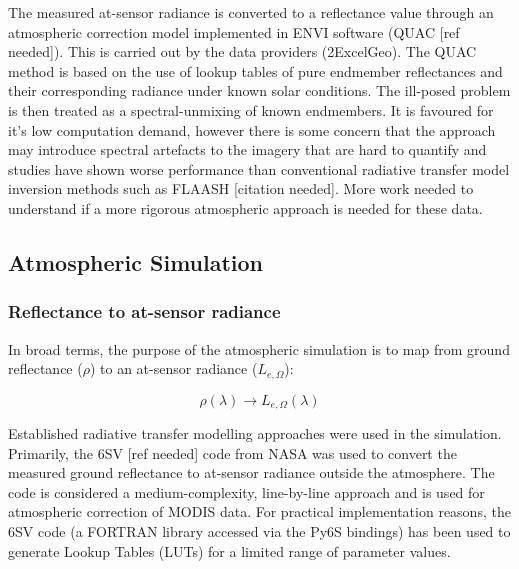 \documentclass[10pt,a4paper,final,twocolumn]{article}
\begin{document}
The measured at-sensor radiance is converted to a reflectance value through an  atmospheric correction model implemented in ENVI software (QUAC [ref needed]). This is carried out by the data providers (2ExcelGeo). The QUAC method is based on the use of lookup tables of pure endmember reflectances and their corresponding radiance under known solar conditions. The ill-posed problem is then treated as a spectral-unmixing of known endmembers. It is favoured for it's low computation demand, however there is some concern that the approach may introduce spectral artefacts to the imagery that are hard to quantify and studies have shown worse performance than conventional radiative transfer model inversion methods such as FLAASH [citation needed]. More work needed to understand if a more rigorous atmospheric approach is needed for these data.

\subsection{Atmospheric Simulation}
\subsubsection{Reflectance to at-sensor radiance}
In broad terms, the purpose of the atmospheric simulation is to map from ground reflectance ($\rho$) to an at-sensor radiance ($L_{e, \Omega}$):

\begin{equation}
\rho(\lambda) \rightarrow L_{e, \Omega} (\lambda)
\end{equation}

Established radiative transfer modelling approaches were used in the simulation. Primarily, the 6SV [ref needed] code from NASA was used to convert the measured ground reflectance to at-sensor radiance outside the atmosphere. The code is considered a medium-complexity, line-by-line approach and is used for atmospheric correction of MODIS data. For practical implementation reasons, the 6SV code (a FORTRAN library accessed via the Py6S bindings) has been used to generate Lookup Tables (LUTs) for a limited range of parameter values.
\end{document}
